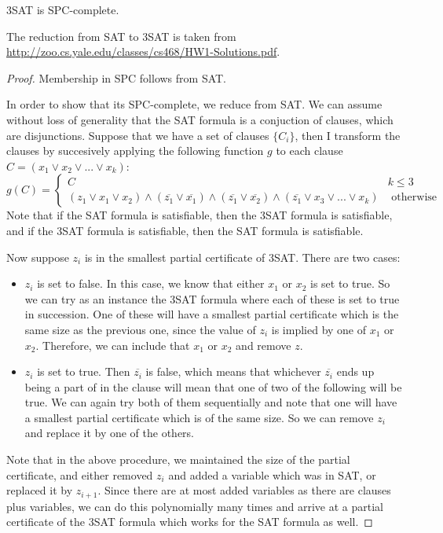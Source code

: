 \documentclass[runningheads,a4paper]{llncs}
\begin{document}
\begin{theorem}
3SAT is SPC-complete.
\end{theorem}

The reduction from SAT to 3SAT is taken from \url{http://zoo.cs.yale.edu/classes/cs468/HW1-Solutions.pdf}.

\begin{proof}
Membership in SPC follows from SAT. 

In order to show that its SPC-complete, we reduce from SAT. We can assume without loss of generality that the SAT formula is a conjuction of clauses, which are disjunctions. Suppose that we have a set of clauses $\{ C_i \}$, then I transform the clauses by succesively applying the following function $g$ to each clause $C = (x_1 \vee x_2 \vee ... \vee x_k)$:
\[ g(C) = \left\{ \begin{array}{cc} C & k \leq 3 \\
						    (z_1 \vee x_1 \vee x_2) \wedge (\overline{z_1} \vee \overline{x_1}) \wedge (\overline{z_1} \vee \overline{x_2}) \wedge (\overline{z_1} \vee x_3 \vee ... \vee x_k) & \text{ otherwise }\end{array} \right. \] 
Note that if the SAT formula is satisfiable, then the 3SAT formula is satisfiable, and if the 3SAT formula is satisfiable, then the SAT formula is satisfiable. 

Now suppose $z_i$ is in the smallest partial certificate of 3SAT. There are two cases:
\begin{itemize}
\item $z_i$ is set to false. In this case, we know that either $x_1$ or $x_2$ is set to true. So we can try as an instance the 3SAT formula where each of these is set to true in succession. One of these will have a smallest partial certificate which is the same size as the previous one, since the value of $z_i$ is implied by one of $x_1$ or $x_2$. Therefore, we can include that $x_1$ or $x_2$ and remove $z$.
\item $z_i$ is set to true. Then $\overline{z_i}$ is false, which means that whichever $\overline{z_i}$ ends up being a part of in the clause will mean that one of two of the following will be true. We can again try both of them sequentially and note that one will have a smallest partial certificate which is of the same size. So we can remove $z_i$ and replace it by one of the others. 
\end{itemize}
Note that in the above procedure, we maintained the size of the partial certificate, and either removed $z_i$ and added a variable which was in SAT, or replaced it by $z_{i+1}$. Since there are at most added variables as there are clauses plus variables, we can do this polynomially many times and arrive at a partial certificate of the 3SAT formula which works for the SAT formula as well.
\end{proof}
\end{document}
